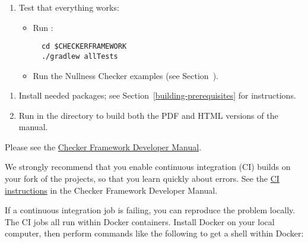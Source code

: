 \begin{enumerate}
\item Test that everything works:

  \begin{itemize}

  \item Run :
\begin{Verbatim}
  cd $CHECKERFRAMEWORK
  ./gradlew allTests
\end{Verbatim}

  \item Run the Nullness Checker examples (see
    Section~).

  \end{itemize}

\end{enumerate}



\begin{enumerate}
\item
Install needed packages; see Section~\ref{building-prerequisites} for
instructions.

\item
Run  in the  directory to build both the PDF and HTML versions of the manual.
\end{enumerate}



Please see the
\href{https://checkerframework.org/manual/developer-manual.html}{Checker Framework Developer Manual}.



We strongly recommend that you enable continuous integration (CI) builds on
your fork of the projects, so that you learn quickly about errors.  See the
\href{https://checkerframework.org/manual/developer-manual.html\#ci}{CI
  instructions} in the Checker Framework Developer Manual.



If a continuous integration job is failing, you can reproduce the problem locally.
The CI jobs all run within Docker containers.
Install Docker on your local computer, then perform commands like the
following to get a shell within Docker:


